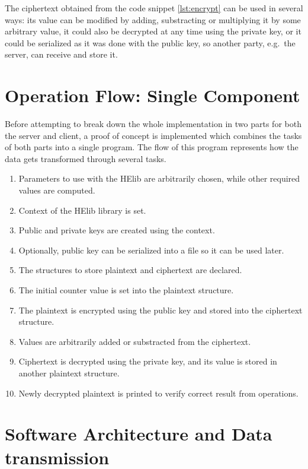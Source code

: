 The ciphertext obtained from the code snippet \ref{lst:encrypt} can be used in several ways: its value can be modified by adding, substracting or multiplying it by some arbitrary value, it could also be decrypted at any time using the private key, or it could be serialized as it was done with the public key, so another party, e.g.\ the server, can receive and store it.

\section{{Operation Flow: Single Component}}

Before attempting to break down the whole implementation in two parts for both the server and client, a proof of concept is implemented which combines the tasks of both parts into a single program. The flow of this program represents how the data gets transformed through several tasks. 

\begin{enumerate}
	\item Parameters to use with the HElib are arbitrarily chosen, while other required values are computed.
	\item Context of the HElib library is set.	
	\item Public and private keys are created using the context.
	\item Optionally, public key can be serialized into a file so it can be used later.
	\item The structures to store plaintext and ciphertext are declared.
	\item The initial counter value is set into the plaintext structure.
	\item The plaintext is encrypted using the public key and stored into the ciphertext structure.
	\item Values are arbitrarily added or substracted from the ciphertext.
	\item Ciphertext is decrypted using the private key, and its value is stored in another plaintext structure.
	\item Newly decrypted plaintext is printed to verify correct result from operations.
\end{enumerate}

\section{{Software Architecture and Data transmission}}


